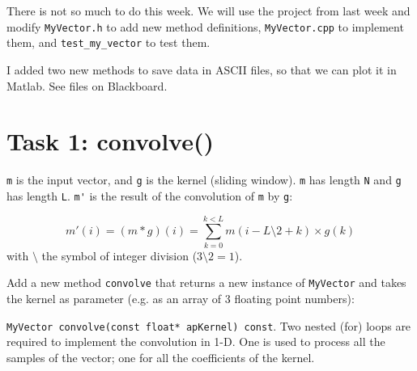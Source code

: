 \documentclass[english,a4paper,12pt,oneside]{article}
\begin{document}
There is not so much to do this week. We will use the project from last week and modify \verb+MyVector.h+ to add new method definitions, \verb+MyVector.cpp+ to implement them, and \verb+test_my_vector+ to test them.

I added two new methods to save data in ASCII files, so that we can plot it in Matlab. 
See files on Blackboard.


\section*{Task 1: convolve()}

\verb+m+ is the input vector, and \verb+g+ is the kernel (sliding window). 
\verb+m+  has length \verb+N+ and \verb+g+ has length \verb+L+.
\verb+m'+ is the result of the convolution of \verb+m+ by \verb+g+: %

$$
m'(i) = (m * g)(i) = \sum^{k < L}_{k=0} m(i - L \setminus 2 + k) \times g(k)
$$
with $\setminus$ the symbol of integer division ($3 \setminus 2 = 1$).

Add a new method \verb+convolve+ that returns a new instance of \verb+MyVector+ and takes the kernel as parameter (e.g. as an array of 3 floating point numbers):

\verb+MyVector convolve(const float* apKernel) const+. Two nested (for) loops are required to implement the convolution in 1-D. One is used to process all the samples of the vector; one for all the coefficients of the kernel. 
\end{document}
